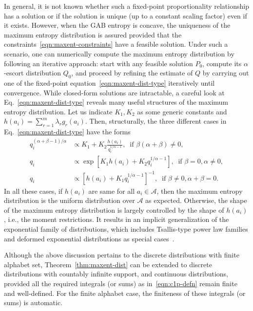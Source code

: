 \documentclass[11pt]{article}
\theoremstyle{plain}
\theoremstyle{remark}
\newcommand{\Acal}{\mathcal{A}}
\begin{document}
In general, it is not known whether such a fixed-point proportionality relationship has a solution or if the solution is unique (up to a constant scaling factor) even if it exists. However, when the GAB entropy is concave, the uniqueness of the maximum entropy distribution is assured provided that the constraints~\eqref{eqn:maxent-constraints} have a feasible solution. Under such a scenario, one can numerically compute the maximum entropy distribution by following an iterative approach: start with any feasible solution $P_0$, compute its $\alpha$-escort distribution $Q_0$, and proceed by refining the estimate of $Q$ by carrying out one of the fixed-point equation~\eqref{eqn:maxent-dist-type} iteratively until convergence. While closed-form solutions are intractable, a careful look at Eq.~\eqref{eqn:maxent-dist-type} reveals many useful structures of the maximum entropy distribution. Let us indicate $K_1, K_2$ as some generic constants and $h(a_i) = \sum_{r=1}^m \lambda_r g_r(a_i)$. Then, structurally, the three different cases in Eq.~\eqref{eqn:maxent-dist-type} have the forms
\begin{align*}
    q_i^{(\alpha+\beta-1)/\alpha} & \propto K_1 + K_2 \frac{h(a_i)}{q_i^{1/\alpha - 1}}, \ \text{ if } \beta(\alpha+\beta) \neq 0,               \\
    q_i                           & \propto \exp\left[ K_1 h(a_i) + K_2 q_i^{1/\alpha - 1} \right], \ \text{ if } \beta = 0, \alpha \neq 0,      \\
    q_i                           & \propto \left[ h(a_i) + K_1 q_i^{1/\alpha - 1} \right]^{-1}, \ \text{ if } \beta \neq 0, \alpha + \beta = 0.
\end{align*}
\noindent In all these cases, if $h(a_i)$ are same for all $a_i \in \Acal$, then the maximum entropy distribution is the uniform distribution over $\Acal$ as expected. Otherwise, the shape of the maximum entropy distribution is largely controlled by the shape of $h(a_i)$, i.e., the moment restrictions. It results in an implicit generalization of the exponential family of distributions, which includes Tsallis-type power law families and deformed exponential distributions as special cases~\citep{naudts2004estimators, tsallis2009introduction, amari2011geometry}.

Although the above discussion pertains to the discrete distributions with finite alphabet set, Theorem~\ref{thm:maxent-dist} can be extended to discrete distributions with countably infinite support, and continuous distributions, provided all the required integrals (or sums) as in~\eqref{eqn:c1p-defn} remain finite and well-defined. For the finite alphabet case, the finiteness of these integrals (or sums) is automatic.
\end{document}
